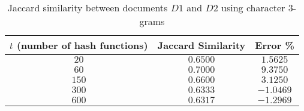 \documentclass[11pt]{article}
\begin{document}
    \begin{table}[!h] 
    \centering
  \caption{Jaccard similarity between documents $D1$ and $D2$ using character $3$-grams}
    \begin{tabular}{|c|c|c|}
      \hline
   $t$ (number of hash functions)  & Jaccard Similarity  & Error \% \\
      \hline      
      $20$ &   $0.6500$  &   $1.5625$   \\
      \hline      
      $60$ &    $0.7000$  & $9.3750$ \\
      \hline      
      $150$ &    $0.6600$  &  $3.1250$\\
      \hline      
      $300$ &      $0.6333$  &   $-1.0469$\\
      \hline
      $600$ &      $0.6317$    & $-1.2969$\\
      \hline
    \end{tabular}
    \end{table}
\end{document}
